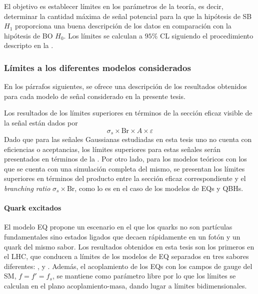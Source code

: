 El objetivo es establecer límites en los parámetros de la teoría, es decir, determinar la cantidad máxima de señal potencial para la que la hipótesis de \ac{SB} \(H_1\) proporciona una buena descripción de los datos en comparación con la hipótesis de \ac{BO} \(H_0\). Los límites se calculan a \(95\%\) \ac{CL} siguiendo el procedimiento descripto en la \Sect{\ref{subsec:strategy:stat_treatment:hypo_test}}.


\subsubsection{Límites a los diferentes modelos considerados}
\label{subsubsec:results:results:bkgsig:results}

En los párrafos siguientes, se ofrece una descripción de los resultados obtenidos para cada modelo de señal considerado en la presente tesis.

Los resultados de los límites superiores en términos de la sección eficaz visible de la señal están dados por
\begin{equation}
    \label{eq:results:results:bkgsig:results:visible_xs}
    \sigma_s \times \text{Br} \times A \times \varepsilon
\end{equation}
Dado que para las señales Gaussianas estudiadas en esta tesis uno no cuenta con eficiencias o aceptancias, los límites superiores para estas señales serán presentados en términos de la \Eqn{\ref{eq:results:results:bkgsig:results:visible_xs}}. Por otro lado, para los modelos teóricos con los que se cuenta con una simulación completa del mismo, se presentan los límites superiores en términos del producto entre la sección eficaz correspondiente y el \textit{branching ratio} \(\sigma_s \times \text{Br}\), como lo es en el caso de los modelos de \acp{EQ} y \acp{QBH}.


\paragraph{Quark excitados}
\label{paragraph:results:results:bkgsig:results:qstar}

El modelo \ac{EQ} propone un escenario en el que los quarks no son partículas fundamentales sino estados ligados que decaen rápidamente en un fotón y un quark del mismo sabor. Los resultados obtenidos en esta tesis son los primeros en el \ac{LHC}, que conducen a límites de los modelos de \ac{EQ} separados en tres sabores diferentes: \qstar, \cstar y \bstar.
Además, el acoplamiento de los \acp{EQ} con los campos de gauge del \ac{SM}, \(f=f'=f_s\), se mantiene como parámetro libre por lo que los límites se calculan en el plano acoplamiento-masa, dando lugar a límites bidimensionales.


